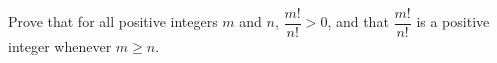 Prove that for all positive integers $m$ and $n$, $\dfrac{m!}{n!}>0$, and that $\dfrac{m!}{n!}$ is a positive integer whenever $m\ge n$.
